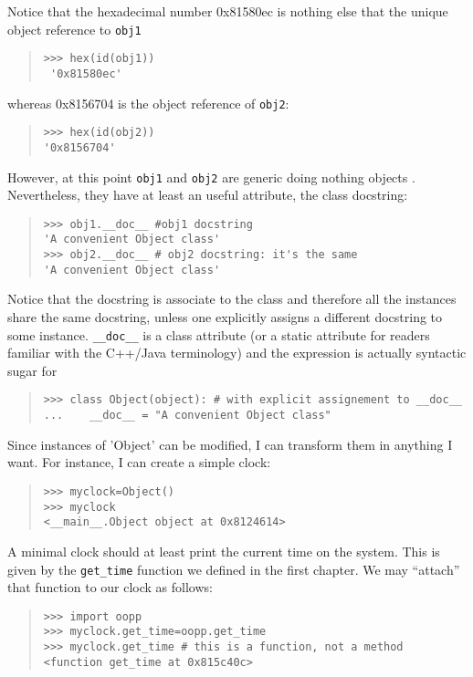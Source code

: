 \documentclass[10pt,english]{article}
\begin{document}
Notice that the hexadecimal number 0x81580ec is nothing else that the
unique object reference to \texttt{obj1}
\begin{quote}
\begin{verbatim}>>> hex(id(obj1))
 '0x81580ec'\end{verbatim}
\end{quote}

whereas 0x8156704 is the object reference of \texttt{obj2}:
\begin{quote}
\begin{verbatim}>>> hex(id(obj2))
'0x8156704'\end{verbatim}
\end{quote}

However, at this point \texttt{obj1} and \texttt{obj2} are generic 
doing nothing objects . Nevertheless, they have 
at least an useful attribute, the class docstring:
\begin{quote}
\begin{verbatim}>>> obj1.__doc__ #obj1 docstring
'A convenient Object class'
>>> obj2.__doc__ # obj2 docstring: it's the same
'A convenient Object class'\end{verbatim}
\end{quote}

Notice that the docstring is associate to the class and therefore all
the instances share the same docstring, unless one explicitly assigns
a different docstring to some instance. \texttt{{\_}{\_}doc{\_}{\_}}
is a class attribute (or a static attribute for readers familiar with the
C++/Java terminology) and the expression is actually syntactic sugar for
\begin{quote}
\begin{verbatim}>>> class Object(object): # with explicit assignement to __doc__
...    __doc__ = "A convenient Object class"\end{verbatim}
\end{quote}

Since instances of 'Object' can be modified, I can transform them in
anything I want. For instance, I can create a simple clock:
\begin{quote}
\begin{verbatim}>>> myclock=Object()
>>> myclock
<__main__.Object object at 0x8124614>\end{verbatim}
\end{quote}

A minimal clock should at least print the current time 
on the system. This is given by the \texttt{get{\_}time} function
we defined in the first chapter. We may ``attach'' that function 
to our clock as follows:
\begin{quote}
\begin{verbatim}>>> import oopp
>>> myclock.get_time=oopp.get_time
>>> myclock.get_time # this is a function, not a method
<function get_time at 0x815c40c>\end{verbatim}
\end{quote}
\end{document}
